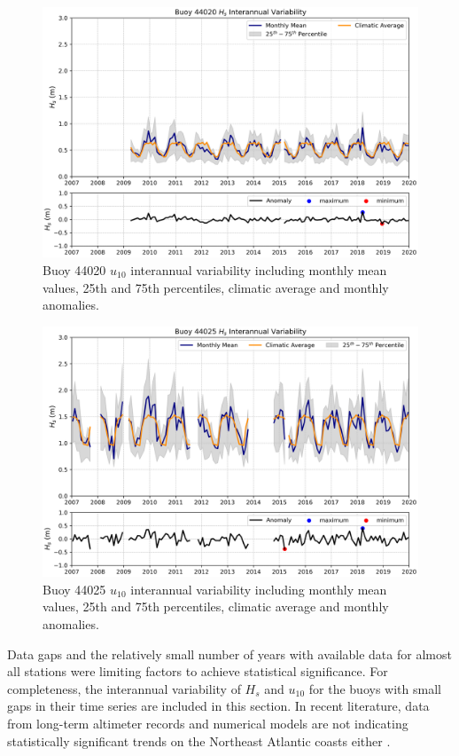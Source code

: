 \begin{figure}[H]
\centering
\includegraphics[width=0.83\linewidth]{Figures/Chapter5/b44020_interranual_anomaly_hs.png}
\caption{Buoy 44020 $u_{10}$ interannual variability including monthly mean values, 25th and 75th percentiles, climatic average and monthly anomalies.}
\label{fig:b44020_wave_inter}
\end{figure}


\begin{figure}[H]
\centering
\includegraphics[width=0.83\linewidth]{Figures/Chapter5/b44025_interranual_anomaly_hs.png}
\caption{Buoy 44025 $u_{10}$ interannual variability including monthly mean values, 25th and 75th percentiles, climatic average and monthly anomalies.}
\label{fig:b44025_wave_inter}
\end{figure}


Data gaps and the relatively small number of years with available data for almost all stations were limiting factors to achieve statistical significance. For completeness, the interannual variability of $H_{s}$ and $u_{10}$ for the buoys with small gaps in their time series are included in this section. In recent literature, data from long-term altimeter records and numerical models are not indicating statistically significant trends on the Northeast Atlantic coasts either \cite{Meucci2020, Timmermans2020}.

